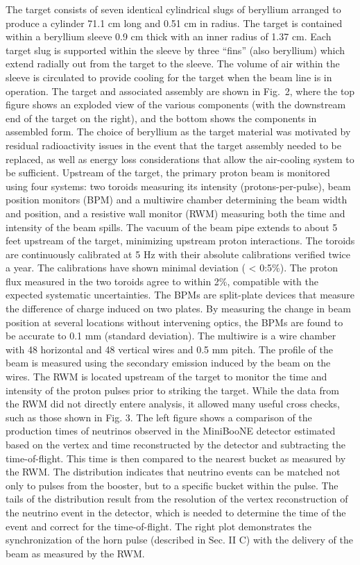 The target consists of seven identical cylindrical slugs of beryllium arranged to produce a %
cylinder 71.1 cm long and 0.51 cm in radius. 
The target is contained within a beryllium sleeve 0.9 cm thick with an inner radius of 1.37 cm.
Each target slug is supported within the sleeve by three ``fins'' (also beryllium) %
which extend radially out from the target to the sleeve. 
The volume of air within the sleeve is circulated to provide cooling for the target when the beam %
line is in operation. 
The target and associated assembly are shown in Fig.~2, where the top figure shows an exploded %
view of the various components (with the downstream end of the target on the right), %
and the bottom shows the components in assembled form. 
The choice of beryllium as the target material was motivated by residual radioactivity issues %
in the event that the target assembly needed to be replaced, as well as energy loss %
considerations that allow the air-cooling system to be sufficient.
Upstream of the target, the primary proton beam is monitored using four systems: %
two toroids measuring its intensity (protons-per-pulse), beam position monitors %
(BPM) and a multiwire chamber determining the beam width and position, %
and a resistive wall monitor (RWM) measuring both the time and intensity of the beam spills.
The vacuum of the beam pipe extends to about 5 feet upstream of the target, %
minimizing upstream proton interactions.
The toroids are continuously calibrated at 5 Hz with their absolute calibrations verified %
twice a year.
The calibrations have shown minimal deviation ( < 0:5\%).
The proton flux measured in the two toroids agree to within 2\%, compatible with the %
expected systematic uncertainties.
The BPMs are split-plate devices that measure the difference of charge induced on two plates. 
By measuring the change in beam position at several locations without intervening optics, %
the BPMs are found to be accurate to 0.1 mm (standard deviation). 
The multiwire is a wire chamber with 48 horizontal and 48 vertical wires and 0.5 mm pitch. 
The profile of the beam is measured using the secondary emission induced by the beam on the wires.
The RWM is located upstream of the target to monitor the time and intensity of the proton %
pulses prior to striking the target. 
While the data from the RWM did not directly entere analysis, it allowed many useful cross %
checks, such as those shown in Fig. 3.
The left figure shows a comparison of the production times of neutrinos observed %
in the MiniBooNE detector estimated based on the vertex and time reconstructed by the detector %
and subtracting the time-of-flight. 
This time is then compared to the nearest bucket as measured by the RWM. 
The distribution indicates that neutrino events can be matched not only to pulses %
from the booster, but to a specific bucket within the pulse.
The tails of the distribution result from the resolution of the vertex reconstruction %
of the neutrino event in the detector, which is needed to determine the time of the %
event and correct for the time-of-flight.
The right plot demonstrates the synchronization of the horn pulse (described in Sec. II C) %
with the delivery of the beam as measured by the RWM.

